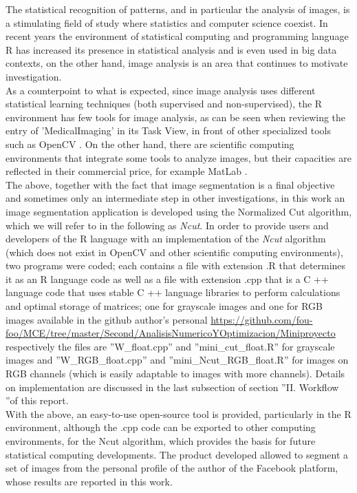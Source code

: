 \documentclass[conference]{IEEEtran}
\begin{document}
The statistical recognition of patterns, and in particular the analysis of images, is a stimulating field of study where statistics and computer science coexist. In recent years the environment of statistical computing and programming language R \cite{R} has increased its presence in statistical analysis and is even used in big data contexts, on the other hand, image analysis is an area that continues to motivate investigation.\\
As a counterpoint to what is expected, since image analysis uses different statistical learning techniques (both supervised and non-supervised), the R environment has few tools for image analysis, as can be seen when reviewing the entry of 'MedicalImaging' in its Task View, in front of other specialized tools such as OpenCV \cite{OpenCV}. On the other hand, there are scientific computing environments that integrate some tools to analyze images, but their capacities are reflected in their commercial price, for example MatLab \cite{MatLab}. \\
The above, together with the fact that image segmentation is a final objective and sometimes only an intermediate step in other investigations, in this work an image segmentation application is developed using the Normalized Cut algorithm, which we will refer to in the following as \textit{Ncut}. In order to provide users and developers of the R language with an implementation of the \textit{Ncut} algorithm (which does not exist in OpenCV and other scientific computing environments), two programs were coded; each contains a file with extension .R that determines it as an R language code as well as a file with extension .cpp that is a C ++ language code that uses stable C ++ language libraries to perform calculations and optimal storage of matrices;
one for grayscale images and one for RGB images available in the github author's personal \cite{github}  \url{https://github.com/fou-foo/MCE/tree/master/Second/AnalisisNumericoYOptimizacion/Miniproyecto} respectively the files are ''W\_float.cpp'' and ''mini\_cut\_float.R'' for grayscale images and ''W\_RGB\_float.cpp'' and ''mini\_Ncut\_RGB\_float.R'' for images on RGB channels (which is easily adaptable to images with more channels). Details on implementation are discussed in the last subsection of section ''II. Workflow ''of this report. \\
With the above, an easy-to-use open-source tool is provided, particularly in the R environment, although the .cpp code can be exported to other computing environments, for the Ncut algorithm, which provides the basis for future statistical computing developments. The product developed allowed to segment a set of images from the personal profile of the author of the Facebook \cite{Facebook} platform, whose results are reported in this work. \\
\end{document}
